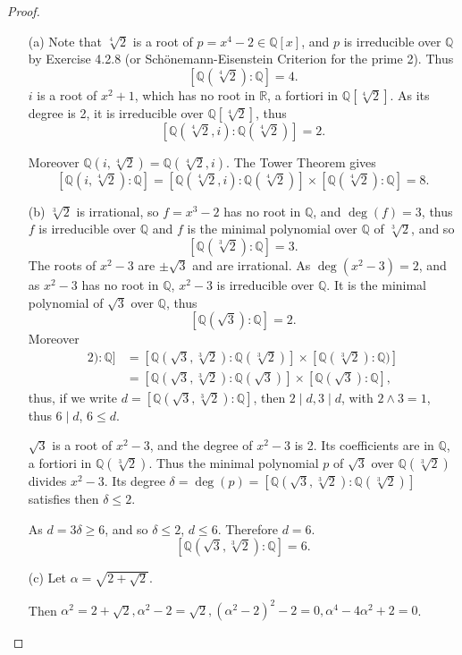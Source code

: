 \documentclass[11pt,a4paper]{article}
\newcommand{\Q}{\mathbb{Q}}
\begin{document}
\begin{proof}
\begin{enumerate}
\item[(a)]
Note that $\sqrt[4]{2}$ is a root of $p=x^4-2 \in \Q[x]$, and $p$ is irreducible over $\Q$ by Exercise 4.2.8 (or Sch\"onemann-Eisenstein Criterion for the prime 2). Thus $$[\Q(\sqrt[4]{2}) : \Q]=4.$$
$i$ is a root of $x^2+1$, which has no root in $\mathbb{R}$, a fortiori in $\Q[\sqrt[4]{2}]$. As its degree is 2, it is irreducible over $\Q[\sqrt[4]{2}]$, thus
$$[\Q(\sqrt[4]{2},i) : \Q(\sqrt[4]{2})]  =2 .$$

Moreover $\Q(i,\sqrt[4]{2}) = \Q(\sqrt[4]{2},i)$. The Tower Theorem gives
$$[\Q(i,\sqrt[4]{2}) : \Q] = [\Q(\sqrt[4]{2},i) : \Q(\sqrt[4]{2})] \times [\Q(\sqrt[4]{2}) : \Q] = 8.$$

\item[(b)] $\sqrt[3]{2}$ is irrational, so $f = x^3-2$ has no root in $\Q$, and $\deg(f)= 3$, thus $f$ is irreducible over $\Q$ and $f$ is the minimal polynomial over $\Q$ of $\sqrt[3]{2}$, and so
$$[\Q(\sqrt[3]{2}) : \Q] = 3.$$
The roots of $x^2 - 3$ are $\pm\sqrt{3}$ and are irrational. As $\deg(x^2-3)=2$, and as $x^2-3$ has no root in $\Q$, $x^2-3$ is irreducible over $\Q$. It is the minimal polynomial of $\sqrt{3}$ over $\Q$, thus
$$[\Q(\sqrt{3}) : \Q] = 2.$$
Moreover 
\begin{align*}
[\Q(\sqrt{3},\sqrt[3]{2}):\Q ]&=[\Q(\sqrt{3},\sqrt[3]{2}):\Q(\sqrt[3]{2}) ] \times [\Q(\sqrt[3]{2}):\Q) ] \\
&= [\Q(\sqrt{3},\sqrt[3]{2}):\Q(\sqrt{3}) ] \times [\Q(\sqrt{3}) : \Q] ,
\end{align*}
thus, if we write $d = [\Q(\sqrt{3},\sqrt[3]{2}):\Q ]$, then $2 \mid d,3 \mid d$, with $2\wedge 3=1$, thus $6\mid d$, $6\leq d$.

$\sqrt{3}$ is a root of  $x^2-3 $, and the degree of $x^2-3 $ is 2. Its coefficients are in $\Q$, a fortiori in $\Q(\sqrt[3]{2})$. Thus the minimal polynomial $p$ of $\sqrt{3}$ over $\Q(\sqrt[3]{2})$ divides $x^2-3$. Its degree $\delta = \deg(p) = [\Q(\sqrt{3},\sqrt[3]{2}):\Q(\sqrt[3]{2}) ]$ satisfies then $\delta \leq 2$.

As $d = 3 \delta \geq 6 $, and so $\delta \leq 2$, $d \leq 6$. Therefore $d=6$.
$$[\Q(\sqrt{3},\sqrt[3]{2}):\Q ]=6.$$

\item[(c)]
Let $\alpha= \sqrt{2+\sqrt{2}}$. 

Then $\alpha^2 = 2 + \sqrt{2}, \alpha^2-2 = \sqrt{2}, (\alpha^2-2)^2 - 2= 0, \alpha^4 - 4 \alpha^2 + 2 = 0$.


\end{enumerate}
\end{proof}
\end{document}
